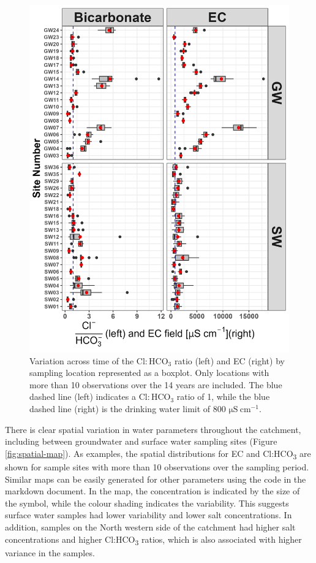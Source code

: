 \documentclass[, manuscript]{copernicus}
\begin{document}
\clearpage

\begin{figure}
\includegraphics[width=0.7\linewidth]{Figures/boxplots} \caption{Variation across time of the $\mathrm{Cl:HCO_3}$ ratio (left) and EC (right) by sampling location represented as a boxplot. Only locations with more than 10 observations over the 14 years are included. The blue dashed line (left) indicates a $\mathrm{Cl:HCO_3}$ ratio of 1, while the blue dashed line (right) is the drinking water limit of 800 $\mathrm{\mu S~cm^{-1}}$.}\label{fig:boxplots}
\end{figure}

There is clear spatial variation in water parameters throughout the
catchment, including between groundwater and surface water sampling
sites (Figure \ref{fig:spatial-map}). As examples, the spatial
distributions for EC and Cl:HCO\textsubscript{3} are shown for sample
sites with more than 10 observations over the sampling period. Similar
maps can be easily generated for other parameters using the code in the
markdown document. In the map, the concentration is indicated by the
size of the symbol, while the colour shading indicates the variability.
This suggests surface water samples had lower variability and lower salt
concentrations. In addition, samples on the North western side of the
catchment had higher salt concentrations and higher
Cl:HCO\textsubscript{3} ratios, which is also associated with higher
variance in the samples.
\end{document}
